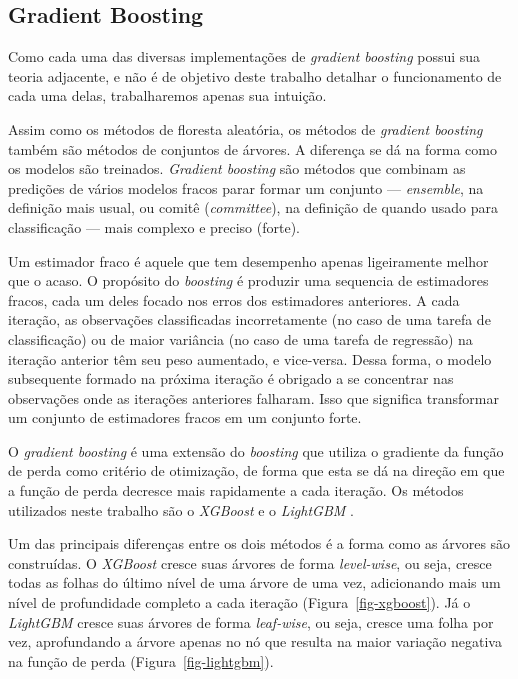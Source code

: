 \documentclass[
  12pt,
  twoside,
  openright,
  a4paper,
  chapter=TITLE,
  section=TITLE,
  brazil]{abntex2}
\begin{document}
\begin{apendicesenv}
\subsection{Gradient Boosting}\label{gradient-boosting}

Como cada uma das diversas implementações de \emph{gradient boosting}
possui sua teoria adjacente, e não é de objetivo deste trabalho detalhar
o funcionamento de cada uma delas, trabalharemos apenas sua intuição.

Assim como os métodos de floresta aleatória, os métodos de
\emph{gradient boosting} também são métodos de conjuntos de árvores. A
diferença se dá na forma como os modelos são treinados. \emph{Gradient
boosting} são métodos que combinam as predições de vários modelos fracos
parar formar um conjunto --- \emph{ensemble}, na definição mais usual,
ou comitê (\emph{committee}), na definição de
\textcite{hastie_elements_2009} quando usado para classificação --- mais
complexo e preciso (forte).

Um estimador fraco é aquele que tem desempenho apenas ligeiramente
melhor que o acaso. O propósito do \emph{boosting} é produzir uma
sequencia de estimadores fracos, cada um deles focado nos erros dos
estimadores anteriores. A cada iteração, as observações classificadas
incorretamente (no caso de uma tarefa de classificação) ou de maior
variância (no caso de uma tarefa de regressão) na iteração anterior têm
seu peso aumentado, e vice-versa. Dessa forma, o modelo subsequente
formado na próxima iteração é obrigado a se concentrar nas observações
onde as iterações anteriores falharam. Isso que significa transformar um
conjunto de estimadores fracos em um conjunto forte.

O \emph{gradient boosting} é uma extensão do \emph{boosting} que utiliza
o gradiente da função de perda como critério de otimização, de forma que
esta se dá na direção em que a função de perda decresce mais rapidamente
a cada iteração. Os métodos utilizados neste trabalho são o
\emph{XGBoost} \autocite{chen_xgboost_2016} e o \emph{LightGBM}
\autocite{ke_lightgbm_2017}.

Um das principais diferenças entre os dois métodos é a forma como as
árvores são construídas. O \emph{XGBoost} cresce suas árvores de forma
\emph{level-wise}, ou seja, cresce todas as folhas do último nível de
uma árvore de uma vez, adicionando mais um nível de profundidade
completo a cada iteração (Figura~\ref{fig-xgboost}). Já o
\emph{LightGBM} cresce suas árvores de forma \emph{leaf-wise}, ou seja,
cresce uma folha por vez, aprofundando a árvore apenas no nó que resulta
na maior variação negativa na função de perda
(Figura~\ref{fig-lightgbm}).


\end{apendicesenv}
\end{document}
